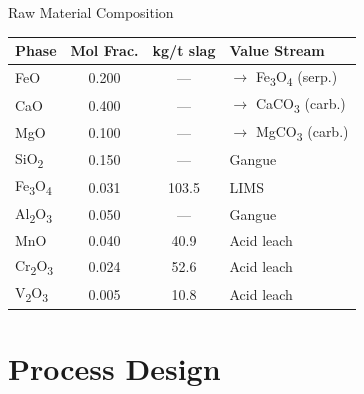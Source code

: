 \documentclass[aspectratio=169]{beamer}
\begin{document}
\begin{frame}{Raw Material Composition}
\begin{table}
\centering
\small
\begin{tabular}{@{}lccl@{}}
\toprule
\textbf{Phase} & \textbf{Mol Frac.} & \textbf{kg/t slag} & \textbf{Value Stream} \\
\midrule
FeO            & 0.200 & ---  & $\to$ Fe\textsubscript{3}O\textsubscript{4} (serp.) \\
CaO            & 0.400 & ---  & $\to$ CaCO\textsubscript{3} (carb.) \\
MgO            & 0.100 & ---  & $\to$ MgCO\textsubscript{3} (carb.) \\
SiO\textsubscript{2} & 0.150 & --- & Gangue \\
Fe\textsubscript{3}O\textsubscript{4} & 0.031 & 103.5 & LIMS \\
Al\textsubscript{2}O\textsubscript{3} & 0.050 & --- & Gangue \\
MnO            & 0.040 & 40.9 & Acid leach \\
Cr\textsubscript{2}O\textsubscript{3} & 0.024 & 52.6 & Acid leach \\
V\textsubscript{2}O\textsubscript{3} & 0.005 & 10.8 & Acid leach \\
\bottomrule
\end{tabular}
\end{table}
\end{frame}

\section{Process Design}
\end{document}
